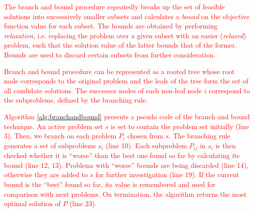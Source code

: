 \documentclass{article}
\theoremstyle{definition}
\begin{document}
\textcolor{red}{The branch and bound procedure repeatedly breaks up the set of feasible solutions into successively smaller subsets and calculates a \textit{bound} on the objective function value for each subset. The bounds are obtained by performing \textit{relaxation}, i.e. replacing the problem over a given subset with an easier (\textit{relaxed}) problem, such that the solution value of the latter bounds that of the former. Bounds are used to discard certain subsets from further consideration.}


\textcolor{red}{
Branch and bound procedure can be represented as a rooted tree whose root node corresponds to the original problem and the leafs of the tree form the set of all candidate solutions. The successor nodes of each non-leaf node $i$ correspond to the subproblems, defined by the branching rule.}

\textcolor{red}{
Algorithm \ref{alg:branchandbound} presents a pseudo code of the branch and bound technique. An active problem set $s$ is set to contain the problem set initially (line 3). Then, we branch on each problem $P_{i}$ chosen from $s$. The branching rule generates a set of subproblems $s_{i}$ (line 10). Each subproblem $P_{ij}$ in $s_{i}$ is then checked whether it is ``worse'' than the best one found so far by calculating its bound (line 12, 13). Problems with ``worse'' bounds are being discarded (line 14), otherwise they are added to $s$ for further investigation (line 19). If the current bound is the ``best'' found so far, its value is remembered and used for comparison with next problems. On termination, the algorithm returns the most optimal solution of $P$ (line 23).}
\end{document}
